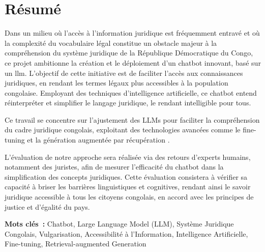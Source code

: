 
\renewcommand{\abstractname}{Résumé} %

\begingroup
\let\clearpage\relax
\let\cleardoublepage\relax
\let\cleardoublepage\relax

\chapter*{Résumé}
Dans un milieu où l'accès à l'information juridique est fréquemment entravé et où la complexité du vocabulaire légal constitue un obstacle majeur à la compréhension du système juridique de la République Démocratique du Congo, ce projet ambitionne la création et le déploiement d'un chatbot innovant, basé sur un \ac{llm}. L'objectif de cette initiative est de faciliter l'accès aux connaissances juridiques, en rendant les termes légaux plus accessibles à la population congolaise. Employant des techniques d'intelligence artificielle, ce chatbot entend réinterpréter et simplifier le langage juridique, le rendant intelligible pour tous.

Ce travail se concentre sur l'ajustement des LLMs pour faciliter la compréhension du cadre juridique congolais, exploitant des technologies avancées comme le fine-tuning et la génération augmentée par récupération \cite{lewis2021retrievalaugmented}. 

L'évaluation de notre approche sera réalisée via des retours d'experts humains, notamment des juristes, afin de mesurer l'efficacité du chatbot dans la simplification des concepts juridiques. Cette évaluation consistera à vérifier sa capacité à briser les barrières linguistiques et cognitives, rendant ainsi le savoir juridique accessible à tous les citoyens congolais, en accord avec les principes de justice et d'égalité du pays.

\vspace{1cm}
\textbf{Mots clés~:} Chatbot, Large Language Model (LLM), Système Juridique Congolais, Vulgarisation, Accessibilité à l'Information, Intelligence Artificielle, Fine-tuning, Retrieval-augmented Generation

\endgroup			

\vfill

\pagebreak



\begingroup
\let\clearpage\relax
\let\cleardoublepage\relax
\let\cleardoublepage\relax

